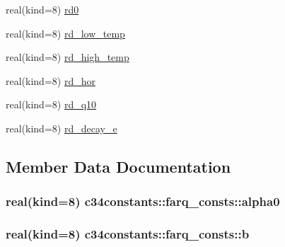 \begin{DoxyCompactItemize}
\item 
real(kind=8) \hyperlink{structc34constants_1_1farq__consts_a69a48d8df8477c75ca42fa00fc9b7f4e}{rd0}
\item 
real(kind=8) \hyperlink{structc34constants_1_1farq__consts_aed622c485dc8a91b7c7ec180a6a905b3}{rd\+\_\+low\+\_\+temp}
\item 
real(kind=8) \hyperlink{structc34constants_1_1farq__consts_aead3f1dc90f03eca3990e692d2cceb05}{rd\+\_\+high\+\_\+temp}
\item 
real(kind=8) \hyperlink{structc34constants_1_1farq__consts_aed74b55c0daee2fe235e1f948dac1a93}{rd\+\_\+hor}
\item 
real(kind=8) \hyperlink{structc34constants_1_1farq__consts_a4bb81d3f16d5f934ce4c07c1a47ad13f}{rd\+\_\+q10}
\item 
real(kind=8) \hyperlink{structc34constants_1_1farq__consts_a3ff8dd1a8307cc3da9f1e082c0abd2f7}{rd\+\_\+decay\+\_\+e}
\end{DoxyCompactItemize}


\subsection{Member Data Documentation}
\hypertarget{structc34constants_1_1farq__consts_ac07e1eade4d8432242f00aafbbc04b32}{}
\subsubsection[{alpha0}]{\setlength{\rightskip}{0pt plus 5cm}real(kind=8) c34constants\+::farq\+\_\+consts\+::alpha0}\label{structc34constants_1_1farq__consts_ac07e1eade4d8432242f00aafbbc04b32}
\hypertarget{structc34constants_1_1farq__consts_a02ff4801f693aa83da862b00607461d3}{}
\subsubsection[{b}]{\setlength{\rightskip}{0pt plus 5cm}real(kind=8) c34constants\+::farq\+\_\+consts\+::b}\label{structc34constants_1_1farq__consts_a02ff4801f693aa83da862b00607461d3}
\hypertarget{structc34constants_1_1farq__consts_ae8edb029d2bb0b51d6321d09650b5cf4}{}
